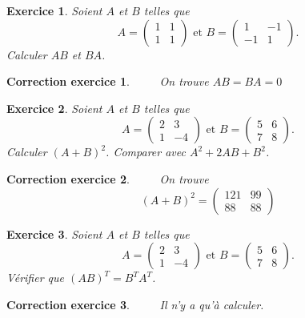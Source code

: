 \documentclass[12pt]{article}
\newtheorem{exercice}{\bf Exercice}
\newtheorem{correction}{\bf Correction exercice}
\newenvironment{exo}{
\begin{exercice}\smallskip\normalfont}{\end{exercice}
}
\newenvironment{cor}{
\begin{correction}\smallskip\normalfont}{\end{correction}
}
\newif\ifcorrige\corrigetrue
\begin{document}
\color{black}
\fi
\begin{exo}
Soient $A$ et $B$ telles que
$$A=\left ( \begin{array}{cc} 1&1\\1&1    \end{array}     \right)
\text{  et  } B=\left ( \begin{array}{cc} 1&-1\\-1&1    \end{array}     \right).$$
 Calculer $AB$ et $BA$.
\end{exo}
\ifcorrige
\color{magenta}
\begin{cor}
  $\qquad$ On trouve $AB=BA=0$
  
    \end{cor}
\color{black}
\fi
\begin{exo}
Soient $A$ et $B$ telles que
$$A=\left ( \begin{array}{cc} 2&3\\1&-4    \end{array}     \right) \text{  et  }
B=\left ( \begin{array}{cc} 5&6\\7&8    \end{array}     \right).$$
 Calculer $(A+B)^2$. Comparer avec $A^2 + 2 AB + B^2$.
\end{exo}
\ifcorrige
\color{magenta}
\begin{cor}
  $\qquad$ On trouve 
  $$(A+B)^2=\left ( \begin{array}{cc} 121&99\\88&88    \end{array}     \right)  $$
  
    \end{cor}
\color{black}
\fi
\begin{exo}
Soient $A$ et $B$ telles que
$$A=\left ( \begin{array}{cc} 2&3\\1&-4    \end{array}     \right) \text{  et  }
B=\left ( \begin{array}{cc} 5&6\\7&8    \end{array}     \right).$$
 V\'erifier que $(AB)^T=B^TA^T$.
\end{exo}
\ifcorrige
\color{magenta}
\begin{cor}
  $\qquad$ Il n'y a qu'\`a calculer.
\end{cor}
\color{black}
\fi
\end{document}
